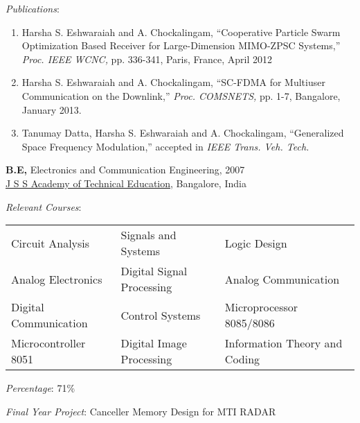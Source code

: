 \documentclass[line]{resume}
\begin{document}
{\begin{resume}
\begin{list2}
         
        \item \textit{Publications}: 
        \begin{enumerate}
      \item
      Harsha S. Eshwaraiah and A. Chockalingam, ``Cooperative Particle Swarm Optimization Based Receiver for 
      Large-Dimension MIMO-ZPSC Systems,''  {\em Proc. IEEE WCNC,} pp. 336-341, Paris, France, April 2012
      \vspace{1mm}
      \item
      Harsha S. Eshwaraiah and A. Chockalingam, ``SC-FDMA for Multiuser Communication on the Downlink,'' 
      {\em Proc. COMSNETS,} pp. 1-7, Bangalore, January 2013.
      \vspace{1mm}
      \item 
      Tanumay Datta, Harsha S. Eshwaraiah and A. Chockalingam, ``Generalized Space Frequency Modulation,'' 
      accepted in {\em IEEE Trans. Veh. Tech.}
     \end{enumerate}        
    \end{list2}

    \textbf{B.E,} Electronics and Communication Engineering, 2007\\
    \href{http://www.jssateb.ac.in/}{J S S Academy of Technical Education}, Bangalore, India 
    \begin{list2}
        
        \item \textit{Relevant Courses}: \\
                       \begin{tabular}{l l l } 
                       \hspace{25mm} Circuit Analysis & Signals and Systems & Logic Design  \\
                       \hspace{25mm} Analog Electronics & Digital Signal Processing & Analog Communication \\ 
                       \hspace{25mm} Digital Communication & Control Systems &Microprocessor 8085/8086 \\
                       \hspace{25mm} Microcontroller 8051 & Digital Image Processing & Information Theory and Coding
                       \end{tabular}        
        
        \item \textit{Percentage}: 71\%
        \item \textit{Final Year Project}: Canceller Memory Design for MTI RADAR
    \end{list2}


\end{resume}}
\end{document}
